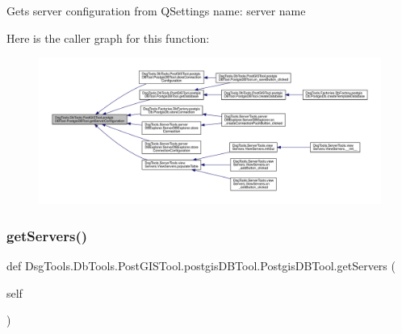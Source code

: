 \begin{DoxyVerb}Gets server configuration from QSettings
name: server name
\end{DoxyVerb}
 Here is the caller graph for this function\+:
\nopagebreak
\begin{figure}[H]
\begin{center}
\leavevmode
\includegraphics[width=350pt]{class_dsg_tools_1_1_db_tools_1_1_post_g_i_s_tool_1_1postgis_d_b_tool_1_1_postgis_d_b_tool_acde88709ce710f8609f29deb9c50c4e9_icgraph}
\end{center}
\end{figure}
\mbox{\label{class_dsg_tools_1_1_db_tools_1_1_post_g_i_s_tool_1_1postgis_d_b_tool_1_1_postgis_d_b_tool_abbb0bbb9e0f488feb77fdea7b220f6d0}} 
\subsubsection{\texorpdfstring{get\+Servers()}{getServers()}}
{\footnotesize\ttfamily def Dsg\+Tools.\+Db\+Tools.\+Post\+G\+I\+S\+Tool.\+postgis\+D\+B\+Tool.\+Postgis\+D\+B\+Tool.\+get\+Servers (\begin{DoxyParamCaption}\item[{}]{self }\end{DoxyParamCaption})}

